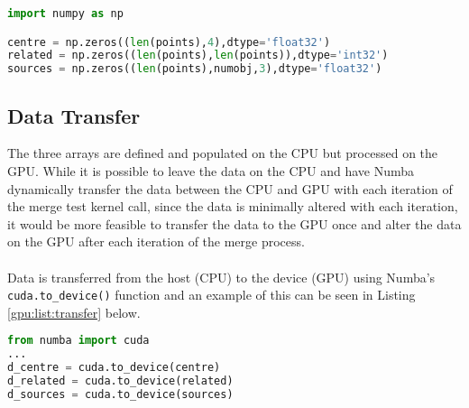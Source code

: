 \begin{lstlisting}[language=Python, label=gpu:list:array,caption=Array reconstruction for transfer to the GPU.]
import numpy as np

centre = np.zeros((len(points),4),dtype='float32')
related = np.zeros((len(points),len(points)),dtype='int32')
sources = np.zeros((len(points),numobj,3),dtype='float32')
\end{lstlisting}

\subsection{Data Transfer}
The three arrays are defined and populated on the CPU but processed on the GPU. While it is possible to leave the data on the CPU and have Numba dynamically transfer the data between the CPU and GPU with each iteration of the merge test kernel call, since the data is minimally altered with each iteration, it would be more feasible to transfer the data to the GPU once and alter the data on the GPU after each iteration of the merge process.
\\
\\
Data is transferred from the host (CPU) to the device (GPU) using Numba's \texttt{cuda.to\_device()} function and an example of this can be seen in Listing \ref{gpu:list:transfer} below.
\begin{lstlisting}[language=Python, label=gpu:list:transfer,caption=Transferring arrays to GPU.]
from numba import cuda
...
d_centre = cuda.to_device(centre)
d_related = cuda.to_device(related)
d_sources = cuda.to_device(sources)
\end{lstlisting}